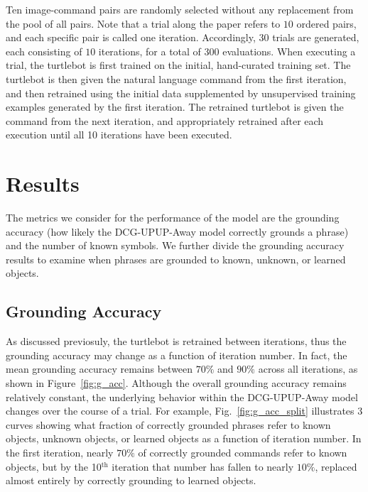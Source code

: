 Ten image-command pairs are randomly selected without any replacement from the pool of all pairs.
Note that a trial along the paper refers to $10$ ordered pairs, and each specific pair is called one iteration.
Accordingly, $30$ trials are generated, each consisting of $10$ iterations, for a total of $300$ evaluations.
When executing a trial, the turtlebot is first trained on the initial, hand-curated training set.
The turtlebot is then given the natural language command from the first iteration, and then retrained using the initial data supplemented by unsupervised training examples generated by the first iteration.
The retrained turtlebot is given the command from the next iteration, and appropriately retrained after each execution until all 10 iterations have been executed.

\section{Results}
The metrics we consider for the performance of the model are the grounding accuracy (how likely the DCG-UPUP-Away model correctly grounds a phrase) and the number of known symbols.
We further divide the grounding accuracy results to examine when phrases are grounded to known, unknown, or learned objects.
\subsection{Grounding Accuracy}
As discussed previosuly, the turtlebot is retrained between iterations, thus the grounding accuracy may change as a function of iteration number. In fact, the mean grounding accuracy remains between $70\%$ and $90\%$ across all iterations, as shown in Figure~\ref{fig:g_acc}. Although the overall grounding accuracy remains relatively constant, the underlying behavior within the DCG-UPUP-Away model changes over the course of a trial. For example, Fig.~\ref{fig:g_acc_split} illustrates 3 curves showing what fraction of correctly grounded phrases refer to known objects, unknown objects, or learned objects as a function of iteration number. In the first iteration, nearly $70\%$ of correctly grounded commands refer to known objects, but by the 10$^\text{th}$ iteration that number has fallen to nearly $10\%$, replaced almost entirely by correctly grounding to learned objects.

